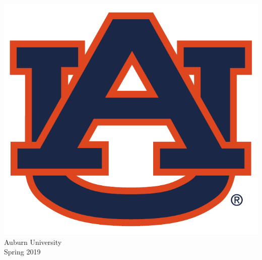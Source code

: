 \begin{titlepage}
\begin{center}
		\includegraphics[scale=.2]{graphics/war_eagle.pdf}\\
		{\large Auburn University}\\
		{\large Spring 2019}
	\end{center}
\end{titlepage}